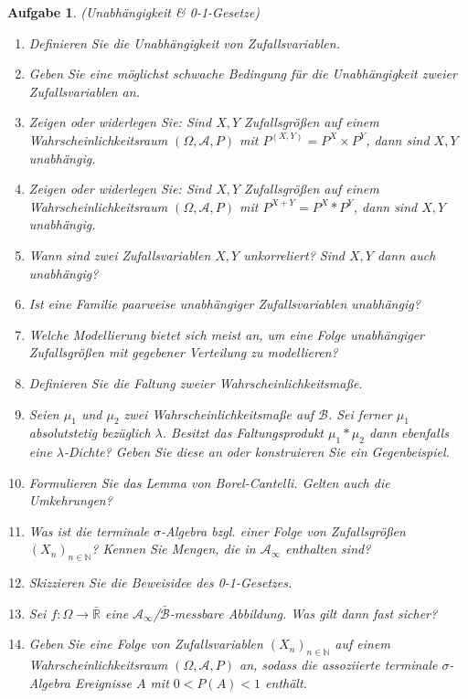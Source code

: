 \documentclass[11pt, a4paper, ngerman]{article}
\newcommand{\N}{\mathbb{N}}
\newcommand{\R}{\mathbb{R}}
\newtheorem{aufgabe}{Aufgabe}
\begin{document}
\begin{aufgabe} (Unabhängigkeit \& 0-1-Gesetze)
   \begin{enumerate}
        \item 
        Definieren Sie die Unabhängigkeit von Zufallsvariablen.
        \item 
        Geben Sie eine möglichst schwache Bedingung für die Unabhängigkeit zweier Zufallsvariablen an. 
        \item 
        Zeigen oder widerlegen Sie: Sind $X,Y$ Zufallsgrößen auf einem Wahrscheinlichkeitsraum $(\Omega, \mathcal{A}, P)$ mit  $P^{(X,Y)} = P^X \times P^Y$, dann sind $X,Y$ unabhängig. 
        \item
        Zeigen oder widerlegen Sie: Sind $X,Y$ Zufallsgrößen auf einem Wahrscheinlichkeitsraum $(\Omega, \mathcal{A}, P)$ mit $P^{X+Y} = P^X * P^Y$, dann sind $X,Y$ unabhängig. 
        \item 
        Wann sind zwei Zufallsvariablen $X,Y$ unkorreliert? Sind $X,Y$ dann auch unabhängig? 
        \item
        Ist eine Familie paarweise unabhängiger Zufallsvariablen unabhängig? 
        \item 
        Welche Modellierung bietet sich meist an, um eine Folge unabhängiger Zufallsgrößen mit gegebener Verteilung zu modellieren? 
        \item 
        Definieren Sie die Faltung zweier Wahrscheinlichkeitsmaße. 
        \item 
        Seien $\mu_1$ und $\mu_2$ zwei Wahrscheinlichkeitsmaße auf $\mathcal{B}$. Sei ferner $\mu_1$ absolutstetig bezüglich $\lambda$. Besitzt das Faltungsprodukt $\mu_1 * \mu_2$ dann ebenfalls eine $\lambda$-Dichte? Geben Sie diese an oder konstruieren Sie ein Gegenbeispiel. 
        \item   
        Formulieren Sie das Lemma von Borel-Cantelli. Gelten auch die Umkehrungen? 
        \item
        Was ist die terminale $\sigma$-Algebra bzgl. einer Folge von Zufallsgrößen $(X_n)_{n \in \N}$? Kennen Sie Mengen, die in $\mathcal{A}_{\infty}$ enthalten sind? 
        \item 
        Skizzieren Sie die Beweisidee des 0-1-Gesetzes. 
        \item 
        Sei $f: \Omega \to \bar{\R}$ eine $\mathcal{A}_{\infty}$/$\bar{\mathcal{B}}$-messbare Abbildung. Was gilt dann fast sicher? 
        \item 
        Geben Sie eine Folge von Zufallsvariablen $(X_n)_{n \in \N}$ auf einem Wahrscheinlichkeitsraum $(\Omega, \mathcal{A}, P)$ an, sodass die assoziierte terminale $\sigma$-Algebra Ereignisse $A$ mit $0 < P(A) < 1$ enthält. 
    \end{enumerate}
    
\end{aufgabe}
\end{document}
